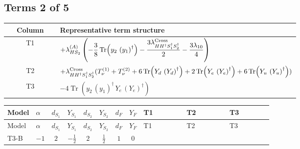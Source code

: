\documentclass[8pt]{article}
\begin{document}
\begin{landscape}
\subsection*{Terms 2 of 5}
\begin{center}
\begin{tabular}{@{}c >{\raggedright\arraybackslash}p{0.82\linewidth}@{}}
\toprule
Column & Representative term structure \\
\midrule
T1 & \(\displaystyle +{\lambda_{HS_2}^{(A)}} \left(-\frac{3}{8} \operatorname{Tr}\!\left({y_2}\,\left({y_1}\right)^{\dagger}\right)-\frac{3 {\lambda_{H H^\dagger S_1^\dagger S_2^\dagger}^{\rm Cross}}}{2}-\frac{3 {\lambda_{10}}}{4}\right)\) \\
\midrule
T2 & \(\displaystyle +{\lambda_{H H^\dagger S_1^\dagger S_2^\dagger}^{\rm Cross}} (T_{\nu}^{(1)}+T_{\nu}^{(2)}+6 \operatorname{Tr}\!\left({Y_d}\,\left({Y_d}\right)^{\dagger}\right)+2 \operatorname{Tr}\!\left({Y_e}\,\left({Y_e}\right)^{\dagger}\right)+6 \operatorname{Tr}\!\left({Y_u}\,\left({Y_u}\right)^{\dagger}\right))\) \\
\midrule
T3 & \(\displaystyle -4 \operatorname{Tr}\!\left({y_2}\,\left({y_1}\right)^{\dagger}\,{Y_e}\,\left({Y_e}\right)^{\dagger}\right)\) \\
\midrule
\bottomrule
\end{tabular}
\end{center}
\smallskip
\tiny
\begin{longtable}{@{}llcccccc >{\raggedright\arraybackslash}p{0.21\linewidth} >{\raggedright\arraybackslash}p{0.21\linewidth} >{\raggedright\arraybackslash}p{0.21\linewidth}@{}}
\toprule
Model & $\alpha$ & $d_{S_1}$ & $Y_{S_1}$ & $d_{S_2}$ & $Y_{S_2}$ & $d_F$ & $Y_F$ & T1 & T2 & T3 \\
\midrule
\endfirsthead
\toprule
Model & $\alpha$ & $d_{S_1}$ & $Y_{S_1}$ & $d_{S_2}$ & $Y_{S_2}$ & $d_F$ & $Y_F$ & T1 & T2 & T3 \\
\midrule
\endhead
T3-B & $-1$ & $2$ & $-\frac{1}{2}$ & $2$ & $\frac{1}{2}$ & $1$ & $0$ & \scriptsize\adjustbox{max width=\linewidth}{$\begin{gathered} +{\lambda_{HS_2}^{(A)}} \left(-\frac{3}{8} \operatorname{Tr}\!\left({y_2}\,\left({y_1}\right)^{\dagger}\right)-\frac{3 {\lambda_{H H^\dagger S_1^\dagger S_2^\dagger}^{\rm Cross}}}{2}-\frac{3 {\lambda_{10}}}{4}\right)\end{gathered}$} & \scriptsize\adjustbox{max width=\linewidth}{$\begin{gathered} +{\lambda_{H H^\dagger S_1^\dagger S_2^\dagger}^{\rm Cross}} (T_{\nu}^{(1)}+T_{\nu}^{(2)}+6 \operatorname{Tr}\!\left({Y_d}\,\left({Y_d}\right)^{\dagger}\right)+2 \operatorname{Tr}\!\left({Y_e}\,\left({Y_e}\right)^{\dagger}\right)+6 \operatorname{Tr}\!\left({Y_u}\,\left({Y_u}\right)^{\dagger}\right))\end{gathered}$} & \scriptsize\adjustbox{max width=\linewidth}{$\begin{gathered} -4 \operatorname{Tr}\!\left({y_2}\,\left({y_1}\right)^{\dagger}\,{Y_e}\,\left({Y_e}\right)^{\dagger}\right)\end{gathered}$} \\

\end{longtable}
\end{landscape}
\end{document}
